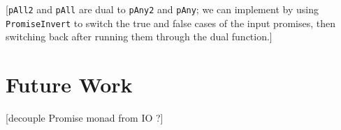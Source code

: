 \documentclass[12pt, english, letterpaper]{kuthesis}
\newcommand{\lit}[1]{\texttt{#1}}
\begin{document}
[\lit{pAll2} and \lit{pAll} are dual to \lit{pAny2} and \lit{pAny}; we can implement by using \lit{PromiseInvert} to switch the true and false cases of the input promises, then switching back after running them through the dual function.]

\chapter*{Future Work}

[decouple Promise monad from IO ?]



\end{document}
